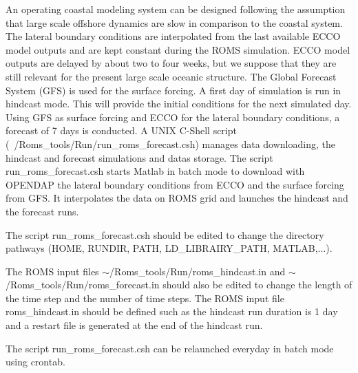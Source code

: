 An operating coastal modeling system can be designed following the 
assumption that large scale offshore dynamics are slow in comparison 
to the coastal system. The lateral boundary conditions are interpolated 
from the last available ECCO model outputs and are kept constant during
the ROMS simulation. ECCO model outputs are delayed by about two to four 
weeks, but we suppose that they are still relevant for the present large 
scale oceanic structure. The Global Forecast System (GFS) is used for the 
surface forcing. A first day of simulation is run in hindcast mode. This 
will provide the initial conditions for the next simulated day. 
Using GFS as surface forcing and ECCO for the lateral boundary conditions, 
a forecast of 7 days is conducted. A UNIX C-Shell script 
(~/Roms\_tools/Run/run\_roms\_forecast.csh) manages
data downloading, the hindcast and forecast simulations
and datas storage.
The script run\_roms\_forecast.csh starts Matlab in 
batch mode to download
with OPENDAP the lateral boundary conditions from ECCO and 
the surface forcing from GFS. It interpolates the data on ROMS 
grid and launches the hindcast and the forecast runs.

The script run\_roms\_forecast.csh should be edited to change the
directory pathways (HOME, RUNDIR, PATH, LD\_LIBRAIRY\_PATH, MATLAB,...).

The ROMS input files $\sim$/Roms\_tools/Run/roms\_hindcast.in and 
$\sim$/Roms\_tools/Run/roms\_forecast.in should also be edited to change
the length of the time step and the number of time steps. 
The ROMS input file roms\_hindcast.in should be defined such as 
the hindcast run duration
is 1 day and a restart file is generated at the end of the hindcast run.

The script run\_roms\_forecast.csh can be relaunched everyday in batch mode 
using crontab.

